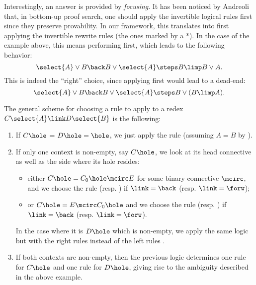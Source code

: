 Interestingly, an answer is provided by {\em focusing}. It has been noticed by
Andreoli~\cite{andreoli1992} that, in bottom-up proof search, one should apply
the invertible logical rules first since they preserve provability. In our
framework, this translates into first applying the invertible rewrite rules (the
ones marked by a *). In the case of the example above, this means performing
 first, which leads to the following behavior:
$$\select{A}\lor B \back B\lor\select{A}\steps B\limp B\lor A.$$
This is indeed the ``right'' choice, since applying  first would
lead to a dead-end:
$$\select{A}\lor B \back B\lor\select{A}\steps B\lor(B\limp A).$$

The general scheme for choosing a rule to apply to a redex $C\select{A} \link
D\select{B}$ is the following:
\begin{enumerate}
  \item If $C\hole$ = $D\hole = \hole$, we just apply the {} rule
  (assuming $A = B$ by ).
  \item If only one context is non-empty, say $C\hole$, we look at its head
  connective as well as the side where its hole resides:
  \begin{itemize}
    \item either $C\hole = C_0\hole \mcirc E$ for some binary connective
    $\mcirc$, and we choose the rule {} (resp.
    {}) if $\link = \back$ (resp. $\link = \forw$);
    \item or $C\hole = E \mcirc C_0\hole$ and we choose the rule
    {} (resp. {}) if $\link = \back$ (resp.
    $\link = \forw$).
  \end{itemize}
  In the case where it is $D\hole$ which is non-empty, we apply the same logic
  but with the right rules {} instead of the left rules
  {}.
  \item If both contexts are non-empty, then the previous logic determines one
  rule for $C\hole$ and one rule for $D\hole$, giving rise to the ambiguity
  described in the above example.
\end{enumerate}
  
